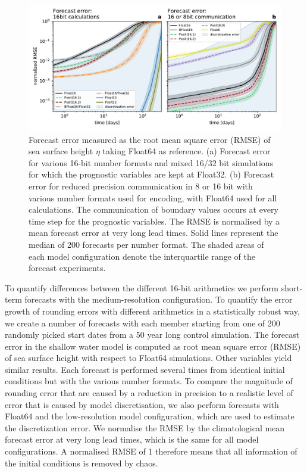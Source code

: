\documentclass[draft]{agujournal2019}
\begin{document}
\begin{figure}
\includegraphics[width=1\textwidth]{../plots/rmse_eta_darker.pdf}
\caption{Forecast error measured as the root mean square error (RMSE) of sea surface height $\eta$ taking Float64 as reference. (a) Forecast error for various 16-bit number formats and mixed 16/32 bit simulations for which the prognostic variables are kept at Float32. (b) Forecast error for reduced precision communication in 8 or 16 bit with various number formats used for encoding, with Float64 used for all calculations.  The communication of boundary values occurs at every time step for the prognostic variables. The RMSE is normalised by a mean forecast error at very long lead times. Solid lines represent the median of 200 forecasts per number format. The shaded areas of each model configuration denote the interquartile range of the forecast experiments.}
\label{fig:rmse}
\end{figure}

To quantify differences between the different 16-bit arithmetics we perform short-term forecasts with the medium-resolution configuration. To quantify the error growth of rounding errors with different arithmetics in a statistically robust way, we create a number of forecasts with each member starting from one of 200 randomly picked start dates from a 50 year long control simulation. The forecast error in the shallow water model is computed as root mean square error (RMSE) of sea surface height with respect to Float64 simulations. Other variables yield similar results. Each forecast is performed several times from identical initial conditions but with the various number formats. To compare the magnitude of rounding error that are caused by a reduction in precision to a realistic level of error that is caused by model discretisation, we also perform forecasts with Float64 and the low-resolution model configuration, which are used to estimate the discretization error. We normalise the RMSE by the climatological mean forecast error at very long lead times, which is the same for all model configurations. A normalised RMSE of 1 therefore means that all information of the initial conditions is removed by chaos.
\end{document}
